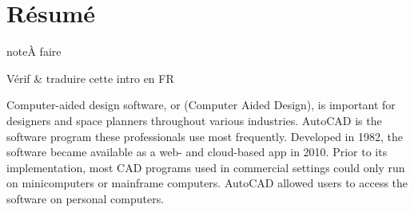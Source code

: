 \documentclass[a4paper,10pt,french]{sphinxmanual}
\begin{document}
\section{Résumé}
\label{\detokenize{docs/refs/autocad-intro:resume}}
\begin{sphinxadmonition}{note}{À faire}

Vérif \& traduire cette intro en FR
\end{sphinxadmonition}

Computer-aided design software, or  (Computer Aided Design), is important for designers and space planners throughout various industries. AutoCAD is the software program these professionals use most frequently. Developed in 1982, the software became available as a web- and cloud-based app in 2010. Prior to its implementation, most CAD programs used in commercial settings could only run on minicomputers or mainframe computers. AutoCAD allowed users to access the software on personal computers.
\end{document}
